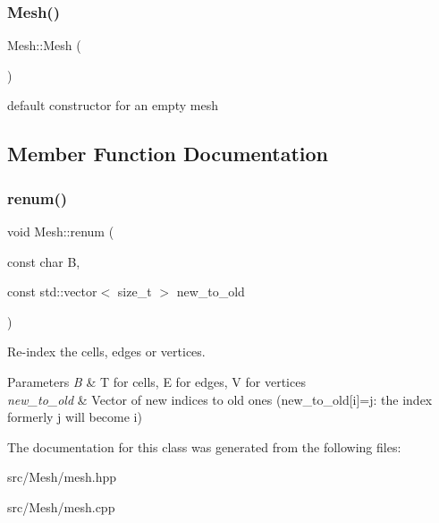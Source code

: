 \subsubsection{\texorpdfstring{Mesh()}{Mesh()}}
{\footnotesize\ttfamily Mesh\+::\+Mesh (\begin{DoxyParamCaption}{ }\end{DoxyParamCaption})}

default constructor for an empty mesh 

\subsection{Member Function Documentation}
\mbox{\label{classHArDCore2D_1_1Mesh_af77873bbc892a7a5b37bf4773c55aefc}} 
\subsubsection{\texorpdfstring{renum()}{renum()}}
{\footnotesize\ttfamily void Mesh\+::renum (\begin{DoxyParamCaption}\item[{const char}]{B,  }\item[{const std\+::vector$<$ size\+\_\+t $>$}]{new\+\_\+to\+\_\+old }\end{DoxyParamCaption})}



Re-\/index the cells, edges or vertices. 


\begin{DoxyParams}{Parameters}
{\em B} & T for cells, E for edges, V for vertices \\
\hline
{\em new\+\_\+to\+\_\+old} & Vector of new indices to old ones (new\+\_\+to\+\_\+old\mbox{[}i\mbox{]}=j\+: the index formerly j will become i) \\
\hline
\end{DoxyParams}


The documentation for this class was generated from the following files\+:\begin{DoxyCompactItemize}
\item 
src/\+Mesh/mesh.\+hpp\item 
src/\+Mesh/mesh.\+cpp\end{DoxyCompactItemize}
